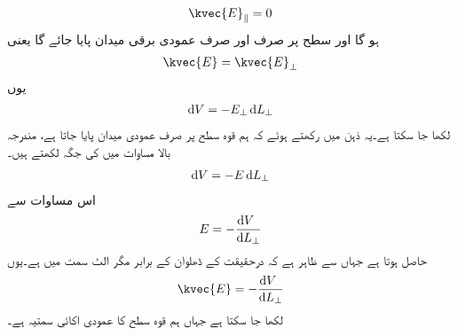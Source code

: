 \begin{align}
\kvec{E}_\parallel=0
\end{align}
ہو گا اور سطح پر صرف اور صرف عمودی برقی میدان پایا جائے گا یعنی
\begin{align}
\kvec{E}=\kvec{E}_\perp
\end{align}
یوں
\begin{align}
\dif V=-E_\perp \dif L_\perp
\end{align}  
لکھا جا سکتا ہے۔یہ ذہن میں رکھتے ہوئے کہ ہم قوہ سطح پر صرف عمودی میدان پایا جاتا ہے، مندرجہ بالا مساوات میں  کی جگہ  لکھتے ہیں۔
\begin{align}
\dif V=-E \dif L_\perp
\end{align}
اس مساوات سے
\begin{align}
E=-\frac{\dif V_{\phantom{\perp}}}{\dif L_\perp}
\end{align}
حاصل ہوتا ہے جہاں سے ظاہر ہے کہ  درحقیقت  کے ڈھلوان کے برابر مگر الٹ سمت میں ہے۔یوں
\begin{align}
\kvec{E}=-\frac{\dif V_{\phantom{\perp}}}{\dif L_\perp} 
\end{align}
لکھا جا سکتا ہے جہاں  ہم قوہ سطح کا عمودی اکائی سمتیہ ہے۔

